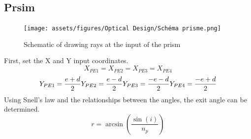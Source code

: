 \subsection{Prsim}
\begin{figure}[H]
    \centering
    \texttt{[image: assets/figures/Optical Design/Schéma prisme.png]}
    \caption{Schematic of drawing rays at the input of the prism}
    \label{fig:Prism_Schematic}
\end{figure}
First, set the X and Y input coordinates.
\begin{equation}
    X_{PE1} = X_{PE2} = X_{PE3} = X_{PE4}
\end{equation}
\begin{equation}
    Y_{PE1} = \frac{e + d}{2} \newline
    Y_{PE2} = \frac{e - d}{2} \newline
    Y_{PE3} = \frac{-e - d}{2} \newline
    Y_{PE4} = \frac{-e + d}{2}
\end{equation}
Using Snell's law and the relationships between the angles, the exit angle can be determined.
\begin{equation}
    r = \arcsin(\frac{\sin(i)}{n_p})
\end{equation}

